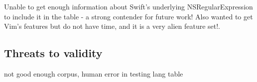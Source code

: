 Unable to get enough information about Swift's underlying NSRegularExpression to include it in the table - a strong contender for future work!  Also wanted to get Vim's features but do not have time, and it is a very alien feature set!.




% 


\subsection{Threats to validity}
not good enough corpus, human error in testing lang table
